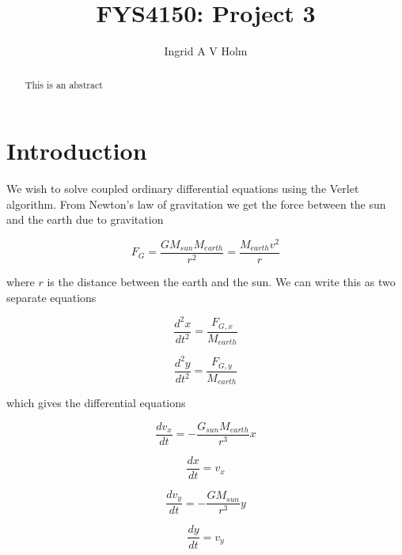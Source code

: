 \documentclass[11pt]{article}
\begin{document}
\title{FYS4150: Project 3}
\author{Ingrid A V Holm}
\maketitle

\begin{abstract}
This is an abstract
\end{abstract}

\section{Introduction}

\begin{flushleft}
We wish to solve coupled ordinary differential equations using the Verlet algorithm. From Newton's law of gravitation we get the force between the sun and the earth due to gravitation

\begin{equation}\label{Newton gravitational}
F_G = \frac{G M_{sun} M_{earth}}{r^2} = \frac{M_{earth}v^2}{r}
\end{equation}

where $r$ is the distance between the earth and the sun. We can write this as two separate equations

\begin{equation}
\frac{d^2x}{dt^2} = \frac{F_{G,x}}{M_{earth}}
\end{equation}

\begin{equation}
\frac{d^2y}{dt^2} = \frac{F_{G,y}}{M_{earth}}
\end{equation}

which gives the differential equations

\begin{equation}
\frac{dv_x}{dt} = -\frac{G_{sun}M_{earth}}{r^3} x
\end{equation}

\begin{equation}
\frac{dx}{dt} = v_x
\end{equation}

\begin{equation}
\frac{dv_y}{dt} = - \frac{GM_{sun}}{r^3} y
\end{equation}

\begin{equation}
\frac{dy}{dt} = v_y
\end{equation}
\end{flushleft}
\end{document}
